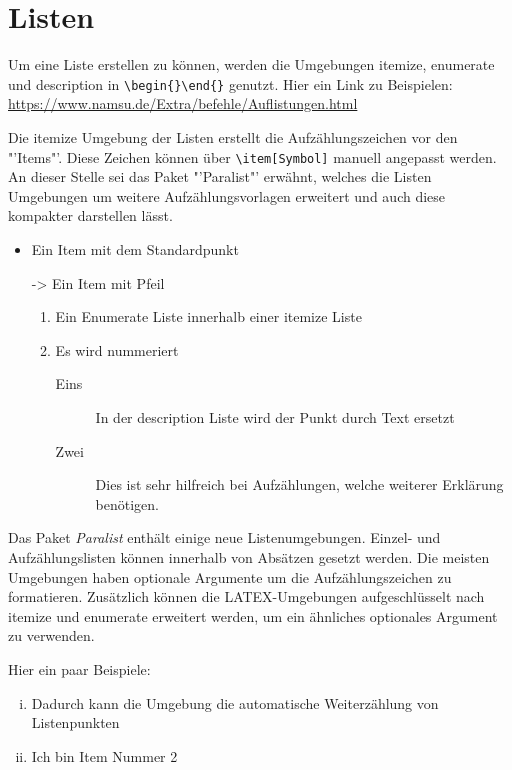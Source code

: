 \chapter{Listen}

Um eine Liste erstellen zu können, werden die Umgebungen itemize, enumerate und description in \verb|\begin{}\end{}| genutzt. Hier ein Link zu Beispielen: \url{https://www.namsu.de/Extra/befehle/Auflistungen.html} \newline

Die itemize Umgebung der Listen erstellt die Aufzählungszeichen vor den "'Items"'. Diese Zeichen können über \verb|\item[Symbol]| manuell angepasst werden. An dieser Stelle sei das Paket "'Paralist"' erwähnt, welches die Listen Umgebungen um weitere Aufzählungsvorlagen erweitert und auch diese kompakter darstellen lässt.  
\begin{itemize}
	\item Ein Item mit dem Standardpunkt
	\item[->] Ein Item mit Pfeil
	\begin{enumerate}
		\item Ein Enumerate Liste innerhalb einer itemize Liste
		\item Es wird nummeriert
		\begin{description}
			\item[Eins] In der description Liste wird der Punkt durch Text ersetzt
			\item[Zwei] Dies ist sehr hilfreich bei Aufzählungen, welche weiterer Erklärung benötigen.
		\end{description}
	\end{enumerate}
\end{itemize}

Das Paket \emph{Paralist} enthält einige neue Listenumgebungen. Einzel- und
Aufzählungslisten können innerhalb von Absätzen gesetzt werden. Die meisten Umgebungen haben optionale Argumente
um die Aufzählungszeichen zu formatieren. Zusätzlich können die LATEX-Umgebungen aufgeschlüsselt nach itemize und enumerate erweitert werden, um ein ähnliches optionales Argument zu verwenden. \newline

Hier ein paar Beispiele:

\begin{enumerate}[(i)]
	\item Dadurch kann die Umgebung die automatische Weiterzählung von Listenpunkten
	\item Ich bin Item Nummer 2
\end{enumerate}

